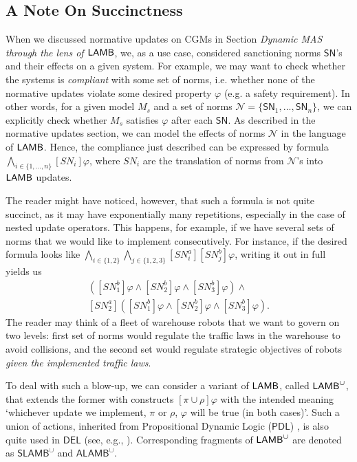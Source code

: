 \subsection*{A Note On Succinctness}
When we discussed normative updates on CGMs in Section \emph{Dynamic MAS through the lens of $\mathsf{LAMB}$}, we, as a use case, considered sanctioning norms $\mathsf{SN}$'s and their effects on a given system. For example, we may want to check whether the systems is \textit{compliant} with some set of norms, i.e. whether none of the normative updates violate some desired property $\varphi$ (e.g. a safety requirement).  In other words, for a given model $M_s$ and a set of norms $\mathcal{N} = \{\mathsf{SN}_1, ..., \mathsf{SN}_n\}$, we can explicitly check whether $M_s$ satisfies $\varphi$ after each $\mathsf{SN}$. As described in the normative updates section, we can model the effects of norms $\mathcal{N}$ in the language of $\mathsf{LAMB}$. Hence, the compliance just described can be expressed by formula $\bigwedge_{i \in \{1,...,n\}} [\mathit{SN}_i]\varphi$, where $\mathit{SN}_i$ are the translation of norms from $\mathcal{N}$'s into $\mathsf{LAMB}$ updates.

The reader might have noticed, however, that such a formula is not quite succinct, as it may have exponentially many repetitions, especially in the case of nested update operators. This happens, for example, if we have several sets of norms that we would like to implement consecutively.  For instance, if the desired formula looks like $\bigwedge_{i \in \{1, 2\}} \bigwedge_{j \in \{1,2,3\}}[\mathit{SN}_i^a][\mathit{SN}_j^b]\varphi$, writing it out in full yields us 
\begin{gather*}
[\mathit{SN}_1^a]([\mathit{SN}_1^b]\varphi \land [\mathit{SN}_2^b]\varphi \land [\mathit{SN}_3^b]\varphi) \land \\
[\mathit{SN}_2^a]([\mathit{SN}_1^b]\varphi \land [\mathit{SN}_2^b]\varphi \land [\mathit{SN}_3^b]\varphi).
\end{gather*}
The reader may think of a fleet of warehouse robots that we want to govern on two levels: first set of norms would regulate the traffic laws in the warehouse to avoid collisions, and the second set would regulate strategic objectives of robots \textit{given the implemented traffic laws}.

To deal with such a blow-up, we can consider a variant of $\mathsf{LAMB}$, called $\mathsf{LAMB}^\cup$, that extends the former with constructs $[\pi \cup \rho]\varphi$ with the intended meaning `whichever update we implement, $\pi$ or $\rho$, $\varphi$ will be true (in both cases)'. Such a union of actions, inherited from Propositional Dynamic Logic ($\mathsf{PDL}$) \cite{fischer79}, is also quite used in $\mathsf{DEL}$ (see, e.g., \cite{bms22,aucher13}). Corresponding fragments of $\mathsf{LAMB}^\cup$ are denoted as  $\mathsf{SLAMB}^\cup$ and $\mathsf{ALAMB}^\cup$.  

